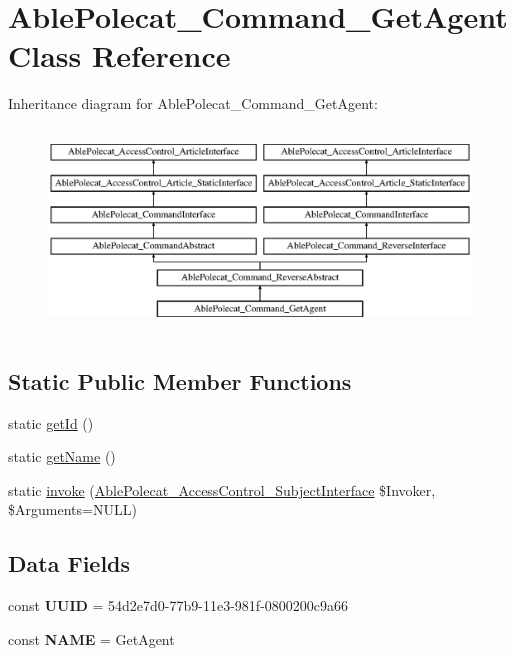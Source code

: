 \hypertarget{class_able_polecat___command___get_agent}{}\section{Able\+Polecat\+\_\+\+Command\+\_\+\+Get\+Agent Class Reference}
\label{class_able_polecat___command___get_agent}
Inheritance diagram for Able\+Polecat\+\_\+\+Command\+\_\+\+Get\+Agent\+:\begin{figure}[H]
\begin{center}
\leavevmode
\includegraphics[height=5.419355cm]{class_able_polecat___command___get_agent}
\end{center}
\end{figure}
\subsection*{Static Public Member Functions}
\begin{DoxyCompactItemize}
\item 
static \hyperlink{class_able_polecat___command___get_agent_acfaa3a96d0cb5a4c0d4d710dcba41e9e}{get\+Id} ()
\item 
static \hyperlink{class_able_polecat___command___get_agent_a4ef9bd37ba3ce8a13c1e8bcf4f72a630}{get\+Name} ()
\item 
static \hyperlink{class_able_polecat___command___get_agent_a6821480fe527af0afdf3691d7cffad5f}{invoke} (\hyperlink{interface_able_polecat___access_control___subject_interface}{Able\+Polecat\+\_\+\+Access\+Control\+\_\+\+Subject\+Interface} \$Invoker, \$Arguments=N\+U\+L\+L)
\end{DoxyCompactItemize}
\subsection*{Data Fields}
\begin{DoxyCompactItemize}
\item 
\hypertarget{class_able_polecat___command___get_agent_a74b892c8c0b86bf9d04c5819898c51e7}{}const {\bfseries U\+U\+I\+D} = \textquotesingle{}54d2e7d0-\/77b9-\/11e3-\/981f-\/0800200c9a66\textquotesingle{}\label{class_able_polecat___command___get_agent_a74b892c8c0b86bf9d04c5819898c51e7}

\item 
\hypertarget{class_able_polecat___command___get_agent_a244352f035b82b20b0efa506167fd862}{}const {\bfseries N\+A\+M\+E} = \textquotesingle{}Get\+Agent\textquotesingle{}\label{class_able_polecat___command___get_agent_a244352f035b82b20b0efa506167fd862}

\end{DoxyCompactItemize}
